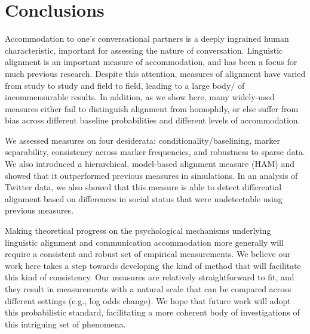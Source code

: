 \documentclass{acm_proc_article-sp}
\begin{document}
\section{Conclusions}

Accommodation to one's conversational partners is a deeply ingrained human characteristic, important for assessing the nature of conversation. Linguistic alignment is an important measure of accommodation, and has been a focus for much previous research. Despite this attention, measures of alignment have varied from study to study and field to field, leading to a large body/ of incommensurable results. In addition, as we show here, many widely-used measures either fail to distinguish alignment from homophily, or else suffer from bias across different baseline probabilities and different levels of accommodation. 

We assessed measures on four desiderata: conditionality/baselining, marker separability, consistency across marker frequencies, and robustness to sparse data.  We also introduced a hierarchical, model-based alignment measure (HAM) and showed that it outperformed previous measures in simulations. In an analysis of Twitter data, we also showed that this measure is able to detect differential alignment based on differences in social status that were undetectable using previous measures. 

Making theoretical progress on the psychological mechanisms underlying linguistic alignment and communication accommodation more generally will require a consistent and robust set of empirical measurements. We believe our work here takes a step towards developing the kind of method that will facilitate this kind of consistency. Our measures are relatively straightforward to fit, and they result in measurements with a natural scale that can be compared across different settings (e.g., log odds change). We hope that future work will adopt this probabilistic standard, facilitating a more coherent body of investigations of this intriguing set of phenomena. 




%
\clearpage

%
%
\balancecolumns
\end{document}

